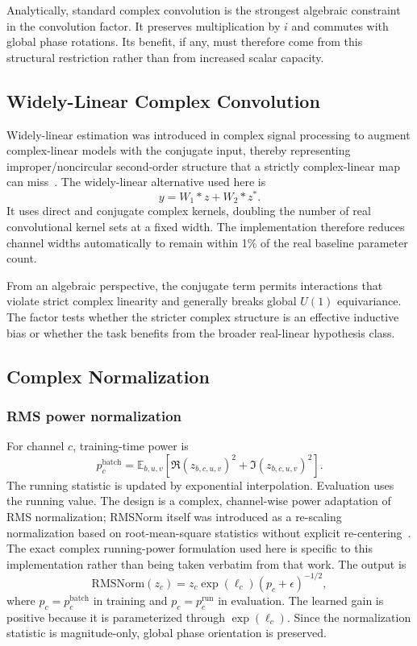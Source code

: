 Analytically, standard complex convolution is the strongest algebraic constraint in the convolution factor. It preserves multiplication by $i$ and commutes with global phase rotations. Its benefit, if any, must therefore come from this structural restriction rather than from increased scalar capacity.

\subsection{Widely-Linear Complex Convolution}
Widely-linear estimation was introduced in complex signal processing to augment complex-linear models with the conjugate input, thereby representing improper/noncircular second-order structure that a strictly complex-linear map can miss~\cite{Picinbono1995WidelyLinear}. The widely-linear alternative used here is
\begin{equation}
y=W_1*z+W_2*z^*.
\label{eq:widely-linear-conv}
\end{equation}
It uses direct and conjugate complex kernels, doubling the number of real convolutional kernel sets at a fixed width. The implementation therefore reduces channel widths automatically to remain within 1\% of the real baseline parameter count.

From an algebraic perspective, the conjugate term permits interactions that violate strict complex linearity and generally breaks global $U(1)$ equivariance. The factor tests whether the stricter complex structure is an effective inductive bias or whether the task benefits from the broader real-linear hypothesis class.

\subsection{Complex Normalization}
\subsubsection{RMS power normalization}
For channel $c$, training-time power is
\begin{equation}
p_c^{\mathrm{batch}}=\mathbb{E}_{b,u,v}\left[\Re(z_{b,c,u,v})^2+\Im(z_{b,c,u,v})^2\right].
\end{equation}
The running statistic is updated by exponential interpolation. Evaluation uses the running value. The design is a complex, channel-wise power adaptation of RMS normalization; RMSNorm itself was introduced as a re-scaling normalization based on root-mean-square statistics without explicit re-centering~\cite{Zhang2019RMSNorm}. The exact complex running-power formulation used here is specific to this implementation rather than being taken verbatim from that work. The output is
\begin{equation}
\mathrm{RMSNorm}(z_c)=z_c\exp(\ell_c)(p_c+\epsilon)^{-1/2},
\end{equation}
where $p_c=p_c^{\mathrm{batch}}$ in training and $p_c=p_c^{\mathrm{run}}$ in evaluation. The learned gain is positive because it is parameterized through $\exp(\ell_c)$. Since the normalization statistic is magnitude-only, global phase orientation is preserved.

